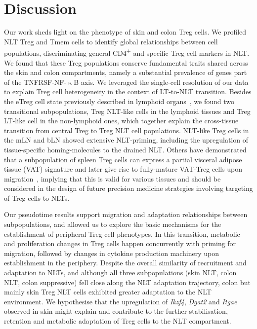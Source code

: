 \section{Discussion}
\label{section2.3}
Our work sheds light on the phenotype of skin and colon Treg cells. We profiled NLT Treg and Tmem cells to identify global relationships between cell populations, discriminating general CD4\textsuperscript{+} and specific Treg cell markers in NLT. We found that these Treg populations conserve fundamental traits shared across the skin and colon compartments, namely a substantial prevalence of genes part of the TNFRSF-NF-${\upkappa}$B axis.
We leveraged the single-cell resolution of our data to explain Treg cell heterogeneity in the context of LT-to-NLT transition. Besides the eTreg cell state previously described in lymphoid organs~\citep{Cretney2011-zd}, we found two transitional subpopulations, Treg NLT-like cells in the lymphoid tissues and Treg LT-like cell in the non-lymphoid ones, which together explain the cross-tissue transition from central Treg to Treg NLT cell populations. NLT-like Treg cells in the mLN and bLN showed extensive NLT-priming, including the upregulation of tissue-specific homing-molecules to the drained NLT. Others have demonstrated that a subpopulation of spleen Treg cells can express a partial visceral adipose tissue (VAT) signature and later give rise to fully-mature VAT-Treg cells upon migration~\citep{Li2018-xq}, implying that this is valid for various tissues and should be considered in the design of future precision medicine strategies involving targeting of Treg cells to NLTs.

Our pseudotime results support migration and adaptation relationships between subpopulations, and allowed us to explore the basic mechanisms for the establishment of peripheral Treg cell phenotypes. In this transition, metabolic and proliferation changes in Treg cells happen concurrently with priming for migration, followed by changes in cytokine production machinery upon establishment in the periphery. Despite the overall similarity of recruitment and adaptation to NLTs, and although all three subpopulations (skin NLT, colon NLT, colon suppressive) fell close along the NLT adaptation trajectory, colon but mainly skin Treg NLT cells exhibited greater adaptation to the NLT environment. We hypothesise that the upregulation of \textit{Ikzf4}, \textit{Dgat2} and \textit{Itgae} observed in skin might explain and contribute to the further stabilisation, retention and metabolic adaptation of Treg cells to the NLT compartment.

